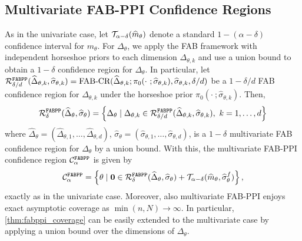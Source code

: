\subsection{Multivariate FAB-PPI Confidence Regions}
As in the univariate case, let $\mathcal T_{\alpha-\delta}(\widehat m_\theta)$ denote a standard $1-(\alpha-\delta)$ confidence interval for $m_\theta$.
For $\Delta_\theta$, we apply the FAB framework with independent horseshoe priors to each dimension $\Delta_{\theta,k}$ and use a union bound to obtain a $1-\delta$ confidence region for $\Delta_\theta$. In particular, let $\mathcal R^{\mathrm{\texttt{FABPP}}}_{\delta/d}(\widehat\Delta_{\theta,k},\widehat\sigma_{\theta,k})=\text{FAB-CR}(\widehat\Delta_{\theta,k};\pi_0(\cdot~;\widehat\sigma_{\theta,k}),\widehat\sigma_{\theta, k}, \delta/d)$ be a $1 - \delta/d$ FAB confidence region for $\Delta_{\theta,k}$ under the horseshoe prior $\pi_{0}(\cdot~;\widehat\sigma_{\theta,k})$. Then,
\begin{equation*}
    \calR^{\FABPPI}_{\delta}(\widehat\Delta_{\theta},\widehat\sigma_{\theta}) = \left\{\Delta_\theta \mid \Delta_{\theta,k} \in \calR^{\FABPPI}_{\delta/d}(\widehat\Delta_{\theta,k},\widehat\sigma_{\theta,k}),\ k = 1,\dots,d\right\}
\end{equation*}
where $\widehat\Delta_{\theta}=(\widehat\Delta_{\theta,1},\ldots,\widehat\Delta_{\theta,d})$, $\widehat\sigma_{\theta}=(\widehat\sigma_{\theta,1},\ldots,\widehat\sigma_{\theta,d})$,
is a $1-\delta$ multivariate FAB confidence region for $\Delta_\theta$ by a union bound. With this, the multivariate FAB-PPI confidence region $\mathcal C_\alpha^{\mathrm{\texttt{FABPP}}}$ is given by
\begin{align*}
    \mathcal C_\alpha^{\mathrm{\texttt{FABPP}}}=\left\{\theta \mid \mathbf{0} \in \mathcal R^{\mathrm{\texttt{FABPP}}}_\delta(\widehat\Delta_\theta,\widehat\sigma_{\theta}) + \mathcal T_{\alpha-\delta}(\widehat m_\theta, \widehat\sigma^f_{\theta})\right\},
\end{align*}
exactly as in the univariate case. Moreover, also multivariate FAB-PPI enjoys exact asymptotic coverage as $\min(n,N) \to \infty$. In particular, \cref{thm:fabppi_coverage} can be easily extended to the multivariate case by applying a union bound over the dimensions of $\Delta_\theta$.
